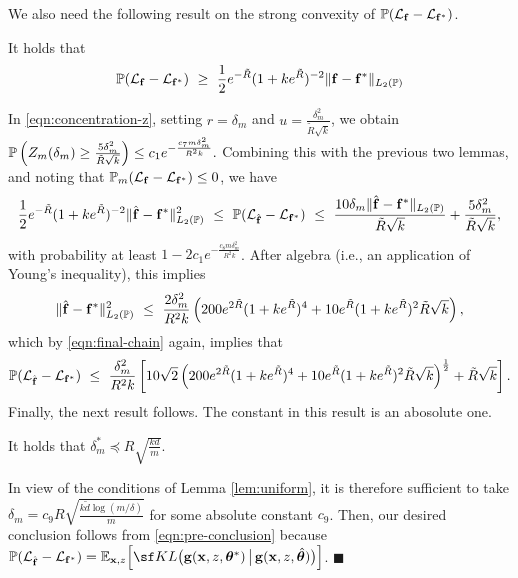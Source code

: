 {    We also need the following result on the strong convexity of $\mathbb{P}(\mathcal{L}_{\mathbf{f}} - \mathcal{L}_{\mathbf{f}^*} )$.

    \begin{lem}
    \label{lem:strong-convexity}
        It holds that $$
        \mathbb{P}(\mathcal{L}_{\mathbf{f}} - \mathcal{L}_{\mathbf{f}^*} ) ~\geq~ \frac{1}{2}e^{-\tilde{R}}(1 + ke^{\tilde{R}})^{-2} \lVert \mathbf{f} - \mathbf{f}^*\rVert_{L_2(\mathbb{P})}
        $$
    \end{lem}

    In \eqref{eqn:concentration-z}, setting $r = \delta_m$ and $u = \frac{\delta^2_m}{\tilde{R}\sqrt{k}}$, we obtain $  \mathbb{P}\left(Z_m(\delta_m) \geq \frac{5\delta_m^2}{\tilde{R}\sqrt{k}}\right)\leq c_1e^{-\frac{c_7 m \delta_m^2}{R^2k}}.$
    Combining this with the previous two lemmas, and noting that $\mathbb{P}_m(\mathcal{L}_{\mathbf{f}} - \mathcal{L}_{\mathbf{f}^*} )\leq 0$, we have 
    \begin{align}
    \label{eqn:final-chain}
    \frac{1}{2}e^{-\tilde{R}}(1 + ke^{\tilde{R}})^{-2} \lVert \hat{\mathbf{f}} - \mathbf{f}^*\rVert_{L_2(\mathbb{P})}^2~\leq~ \mathbb{P}(\mathcal{L}_{\hat{\mathbf{f}}} - \mathcal{L}_{\mathbf{f}^*} ) ~\leq~ \frac{10\delta_m\lVert \hat{\mathbf{f}} - \mathbf{f}^*\rVert_{L_2(\mathbb{P})}  }{\tilde{R}\sqrt{k}} + \frac{5\delta_m^2}{\tilde{R}\sqrt{k}},
    \end{align}
    with probability at least $1 -
2c_1e^{-\frac{c_8 m \delta_m^2}{R^2k}}$.    After algebra (i.e., an application of Young's inequality), this implies
    $$
    \lVert \hat{\mathbf{f}} - \mathbf{f}^*\rVert_{L_2(\mathbb{P})}^2~\leq~\frac{2\delta^2_m}{R^2{k}}\left(
    200e^{2\tilde{R}}(1 + ke^{\tilde{R}})^{4} 
    + 10e^{\tilde{R}}(1 + ke^{\tilde{R}})^{2}\tilde{R}\sqrt{k}
    \right),
    $$
    which by \eqref{eqn:final-chain} again, implies that 
    \begin{align}
        \label{eqn:pre-conclusion}
           \mathbb{P}(\mathcal{L}_{\hat{\mathbf{f}}} - \mathcal{L}_{\mathbf{f}^*} ) ~\leq~ \frac{\delta^2_m}{R^2 k}\left[
    10\sqrt{2}\left(
    200e^{2\tilde{R}}(1 + ke^{\tilde{R}})^{4} 
    + 10e^{\tilde{R}}(1 + ke^{\tilde{R}})^{2}\tilde{R}\sqrt{k}
    \right)^{\frac{1}{2}} + \tilde{R}\sqrt{k}
    \right]. 
    \end{align}
    Finally, the next result follows. The constant in this result is an abosolute one.
    \begin{lem}
    \label{lem:local-complexity}
        It holds that 
        $\delta^*_m \preceq R\sqrt{\frac{kd}{m}}$. 
    \end{lem}
    In view of the conditions of Lemma \ref{lem:uniform}, it is therefore sufficient to take $\delta_m = c_9 R\sqrt{\frac{k\tilde{d} \log(m/\delta)}{m}}$ for some absolute constant $c_9$.
    Then, our desired conclusion  follows from \eqref{eqn:pre-conclusion} because $\Prob(\Lcal_{\hat{\fvec}} - \Lcal_{\fvec^*} ) = \E_{\x, z}\Big[
    {\sf KL}\big( \mathbf{g}(\x, z, \thetavec^*)\,\big\vert\,\mathbf{g}(\x, z, \hat{\thetavec})\big)
    \Big]$.
\hfill $\blacksquare$}
\vspace{3mm}


